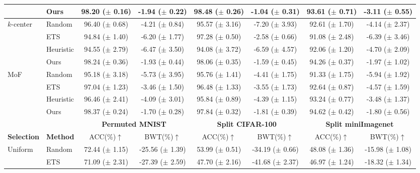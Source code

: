 \begin{table}[t]
{\begin{tabular}{l l c c c c c c}
         & Ours & 98.20 ($\pm$ 0.16) & -1.94 ($\pm$ 0.22) & 98.48 ($\pm$ 0.26) & -1.04 ($\pm$ 0.31) & 93.61 ($\pm$ 0.71) & -3.11 ($\pm$ 0.55) \\
        \midrule 
        \multirow{4}{*}{$k$-center} & Random & 96.40 ($\pm$ 0.68) & -4.21 ($\pm$ 0.84) & 95.57 ($\pm$ 3.16) & -7.20 ($\pm$ 3.93) & 92.61 ($\pm$ 1.70) & -4.14 ($\pm$ 2.37) \\
         & ETS & 94.84 ($\pm$ 1.40) & -6.20 ($\pm$ 1.77) & 97.28 ($\pm$ 0.50) & -2.58 ($\pm$ 0.66) & 91.08 ($\pm$ 2.48) & -6.39 ($\pm$ 3.46) \\
         & Heuristic & 94.55 ($\pm$ 2.79) & -6.47 ($\pm$ 3.50) & 94.08 ($\pm$ 3.72) & -6.59 ($\pm$ 4.57) & 92.06 ($\pm$ 1.20) & -4.70 ($\pm$ 2.09) \\
         & Ours & 98.24 ($\pm$ 0.36) & -1.93 ($\pm$ 0.44) & 98.06 ($\pm$ 0.35) & -1.59 ($\pm$ 0.45) & 94.26 ($\pm$ 0.37) & -1.97 ($\pm$ 1.02) \\
        \midrule
        \multirow{4}{*}{MoF} & Random & 95.18 ($\pm$ 3.18) & -5.73 ($\pm$ 3.95) & 95.76 ($\pm$ 1.41) & -4.41 ($\pm$ 1.75) & 91.33 ($\pm$ 1.75) & -5.94 ($\pm$ 1.92) \\
         & ETS & 97.04 ($\pm$ 1.23) & -3.46 ($\pm$ 1.50) & 96.48 ($\pm$ 1.33) & -3.55 ($\pm$ 1.73) & 92.64 ($\pm$ 0.87) & -4.57 ($\pm$ 1.59) \\
         & Heuristic & 96.46 ($\pm$ 2.41) & -4.09 ($\pm$ 3.01) & 95.84 ($\pm$ 0.89) & -4.39 ($\pm$ 1.15) & 93.24 ($\pm$ 0.77) & -3.48 ($\pm$ 1.37) \\
         & Ours & 98.37 ($\pm$ 0.24) & -1.70 ($\pm$ 0.28) & 97.84 ($\pm$ 0.32) & -1.81 ($\pm$ 0.39) & 94.62 ($\pm$ 0.42) & -1.80 ($\pm$ 0.56) \\
        \bottomrule
        \toprule
         & & \multicolumn{2}{c}{{\bf Permuted MNIST} } & \multicolumn{2}{c}{{\bf Split CIFAR-100} } & \multicolumn{2}{c}{{\bf Split miniImagenet} } \\
         \cmidrule(lr){3-4} \cmidrule(lr){5-6} \cmidrule(lr){7-8} %
         {\bf Selection} & {\bf Method} & ACC(\%)$\uparrow$ & BWT(\%)$\uparrow$ & ACC(\%)$\uparrow$ & BWT(\%)$\uparrow$ & ACC(\%)$\uparrow$ & BWT(\%)$\uparrow$ \\
        \midrule 
        \multirow{4}{*}{Uniform} & Random & 72.44 ($\pm$ 1.15) & -25.56 ($\pm$ 1.39) & 53.99 ($\pm$ 0.51) & -34.19 ($\pm$ 0.66) & 48.08 ($\pm$ 1.36) & -15.98 ($\pm$ 1.08) \\
         & ETS & 71.09 ($\pm$ 2.31) & -27.39 ($\pm$ 2.59) & 47.70 ($\pm$ 2.16) & -41.68 ($\pm$ 2.37) & 46.97 ($\pm$ 1.24) & -18.32 ($\pm$ 1.34) \\

\end{tabular}}
\end{table}
